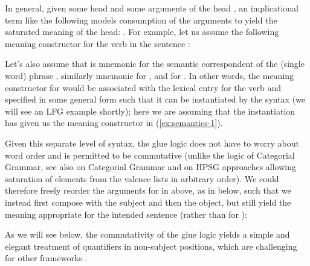 In general, given some head  and some arguments of the head
, an implicational term like the following
models consumption of the arguments to yield the saturated meaning of
the head: . For
example, let us assume the following meaning constructor for the verb
 in the sentence :
%
\begin{exe}
  
\ex \label{ex:semantics-1} 
\end{exe}
%
Let's also assume that  is mnemonic for the semantic
correspondent of the (single word) phrase , 
similarly mnemonic for , and  for
. In other words, the meaning constructor for 
would be associated with the lexical entry for the verb and specified
in some general form such that it can be instantiated by the syntax
(we will see an LFG example shortly); here we are assuming that the
instantiation has given us the meaning constructor in
(\ref{ex:semantics-1}).

Given this separate level of syntax, the glue logic does not
have to worry about word order and is permitted to be commutative
(unlike the logic of Categorial Grammar, see also  on Categorial Grammar and \crossrefchapteralt[\page \pageref{order-hcs-binary}]{order} on HPSG approaches allowing saturation of elements from the valence lists in arbitrary order). We could therefore freely
reorder the arguments for  in  above, as in  below, such that we instead
first compose with the subject and then the object, but still yield
the meaning appropriate for the intended sentence 
(rather than for ):
%
\begin{exe}
  
\ex \label{ex:semantics-2}
\end{exe}
%
As we will see below, the commutativity of the glue logic yields a
simple and elegant treatment of quantifiers in non-subject positions,
which are challenging for other frameworks \citep[see, for example, the
careful pedagogical presentation of the issue
in][244--263]{jacobson14}. 

